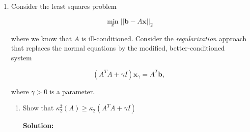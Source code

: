 \documentclass[12pt]{article}
\newcommand{\norm}[1]{\left|\left| #1 \right|\right|}
\begin{document}
\begin{enumerate}
\begin{enumerate}
\begin{enumerate}
    {\bf Solution:}

    If $P(\alpha)$ has elemental values of $1/n$, a matrix vector multiplication can be computed
    efficiently in storage by simply storing the value of $\alpha /n$ in a single float, and
    the resulting scalar vector multiplicatio from $\alpha /n$ and a vector would produce the
    same results as if you did the enitre matrix vector multiplication since all elements
    in the matrix have the same value.

    If, they infact, do not have the same values, then you can store only the non-zero elements and their
    indices, and simply do a matrix vector multpilcation that way, where you would ignore all the zeros as
    they wouldn't produce any meaningful results. Something such as {\sc csr} matrix format.

    \item Show that if the power method is applied, then if the initial guess $\mathbf{v}_{0}$
    satisfies $\norm{\mathbf{v}_{0}}_{1} = 1$, then all subsequent iterates $\mathbf{v}_{k}$
    also have a unit $\ell_{1}$-norm, and hence there is no need to normalize throughout the iteration.

    {\bf Solution:}

  \end{enumerate}
\end{enumerate}

\item Consider the least squares problem

\[
\min_{x} \norm{\mathbf{b} - A\mathbf{x}}_{2}
\]

where we know that $A$ is ill-conditioned. Consider the {\em regularization} approach
that replaces the normal equations by the modified, better-conditioned system

\[
\left( A^{T}A + \gamma I\right)\mathbf{x}_{\gamma} = A^{T}\mathbf{b},
\]

where $\gamma > 0$ is a parameter.

\begin{enumerate}
  \item Show that $\kappa_{2}^{2}(A) \geq \kappa_{2}\left( A^{T}A + \gamma I \right)$

  {\bf Solution:}


\end{enumerate}
\end{enumerate}
\end{document}
